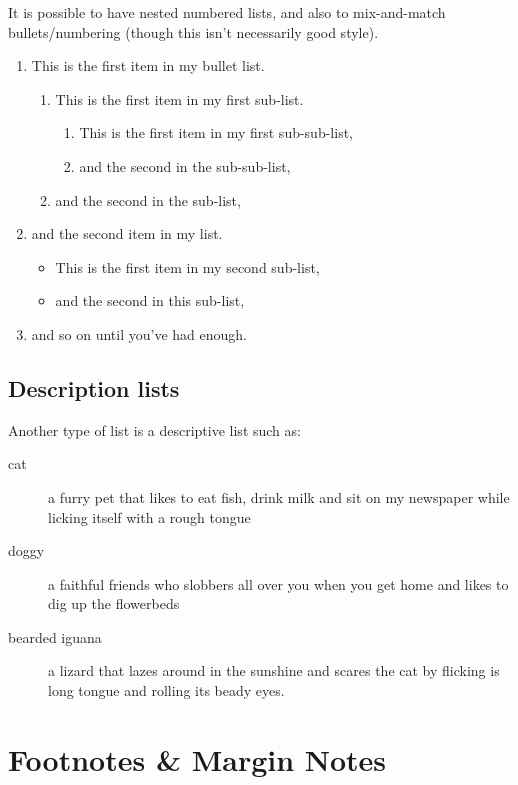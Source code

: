 \documentclass[a4paper,11pt]{article}
\begin{document}
It is possible to have nested numbered lists, and also to mix-and-match bullets/numbering (though this isn't necessarily good style).
\begin{enumerate}
\item This is the first item in my bullet list.
	\begin{enumerate}
	\item This is the first item in my first sub-list.
		\begin{enumerate}
		\item This is the first item in my first sub-sub-list,
		\item and the second in the sub-sub-list,
		\end{enumerate}
	\item and the second in the sub-list,
	\end{enumerate}
\item and the second item in my list.
	\begin{itemize}
	\item This is the first item in my second sub-list,
	\item and the second in this sub-list,
	\end{itemize}
\item and so on until you've had enough.
\end{enumerate}


\subsection{Description lists}
Another type of list is a descriptive list such as:

\begin{description}
\item[cat] a furry pet  that likes to eat fish, drink milk and sit on my newspaper while licking itself with a rough tongue
\item[doggy] a faithful friends who slobbers all over you when you get home and likes to dig up the flowerbeds
\item[bearded iguana] a lizard that lazes around  in the sunshine and scares the cat by flicking is long tongue and rolling its beady eyes.
\end{description}


\pagebreak

\section{Footnotes \& Margin Notes}
\end{document}
